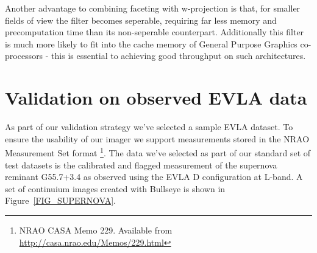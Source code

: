 \documentclass[a4paper,10pt]{article}
\begin{document}
Another advantage to combining faceting with w-projection is that, for smaller fields of view the filter becomes seperable, requiring far
less memory and precomputation time than its non-seperable counterpart. Additionally this filter is much more likely to fit into the cache memory
of General Purpose Graphics co-processors - this is essential to achieving good throughput on such architectures.
\section{Validation on observed EVLA data}
As part of our validation strategy we've selected a sample EVLA dataset. To ensure the usability of our imager
we support measurements stored in the NRAO Measurement Set format \footnote{NRAO CASA Memo 229. Available from \url{http://casa.nrao.edu/Memos/229.html}}.
The data we've selected as part of our standard set of test datasets is the calibrated and flagged measurement of the supernova
reminant G55.7+3.4 as observed using the EVLA D configuration at L-band. A set of continuium images created with Bullseye 
is shown in Figure~\ref{FIG_SUPERNOVA}.
\end{document}
